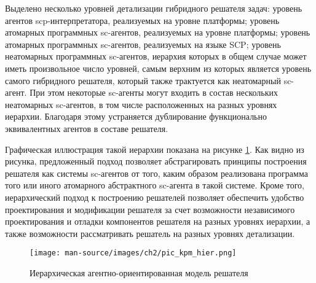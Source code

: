 \documentclass{thesisby}
\begin{document}


Выделено несколько уровней детализации гибридного решателя задач: уровень агентов scp-интерпретатора, реализуемых на уровне платформы; уровень атомарных программных sc-агентов, реализуемых на уровне платформы; уровень атомарных программных sc-агентов, реализуемых на языке SCP; уровень неатомарных программных sc-агентов, иерархия которых в общем случае может иметь произвольное число уровней, самым верхним из которых является уровень самого гибридного решателя, который также трактуется как неатомарный sc-агент. При этом некоторые sc-агенты могут входить в состав нескольких неатомарных sc-агентов, в том числе расположенных на разных уровнях иерархии. Благодаря этому устраняется дублирование функционально эквивалентных агентов в составе решателя.

Графическая иллюстрация такой иерархии показана на рисунке \ref{fig:pic_kpm_hier}. Как видно из рисунка, предложенный подход позволяет абстрагировать принципы построения решателя как системы sc-агентов от того, каким образом реализована программа того или иного атомарного абстрактного sc-агента в такой системе. Кроме того, иерархический подход к построению решателей позволяет обеспечить удобство проектирования и модификации решателя за счет возможности независимого проектирования и отладки компонентов решателя на разных уровнях иерархии, а также возможности рассматривать решатель на разных уровнях детализации. 

\begin{figure}[H]
    \centering
    \texttt{[image: man-source/images/ch2/pic\_kpm\_hier.png]}
    \caption{Иерархическая агентно-ориентированная модель решателя}
    \label{fig:pic_kpm_hier}
\end{figure}

\iffalse
\begin{figure}[H]
    \centering
    \texttt{[image: man-source/images/ch2/pic\_ips.png]}
    \caption{Детализированная схема обработки информации в интеллектуальной системе}
    \label{fig:pic_ips}
\end{figure}
\fi
\end{document}

